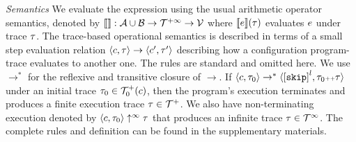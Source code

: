 \emph{Semantics}
We evaluate the expression using the usual arithmetic operator semantics, denoted by
$\llbracket  \rrbracket : \mathcal{A} \cup \mathcal{B} \to \mathcal{T}^{+\infty} \to \mathcal{V}$ where
$\llbracket e \rrbracket(\mathtt{\tau})$ evaluates $e$ under trace $\mathtt{\tau}$.
The trace-based operational semantics is described in terms of a small step evaluation relation $\langle c, \mathtt{\tau} \rangle \to \langle c', \mathtt{\tau}' \rangle$ describing how a configuration program-trace evaluates to another
one.
The rules are standard and omitted here.
We use $\to^*$ for the reflexive and transitive closure of $\to$. 
If $\config{c, \trace_0} \rightarrow^{*} \config{\clabel{\eskip}^l, \trace_0 \tracecat \trace}$ under an initial trace 
$\mathtt{\tau}_0 \in \mathcal{T}^{+}_0(c)$,
then the program's execution terminates and produces a finite execution trace $\mathtt{\tau} \in \mathcal{T}^{+}$. We also have non-terminating execution denoted by $\langle c, \mathtt{\tau}_0 \rangle \uparrow^{\infty} \mathtt{\tau}$ that produces an infinite trace $\mathtt{\tau} \in \mathcal{T}^{\infty}$. The complete rules and definition can be found in the supplementary materials.
